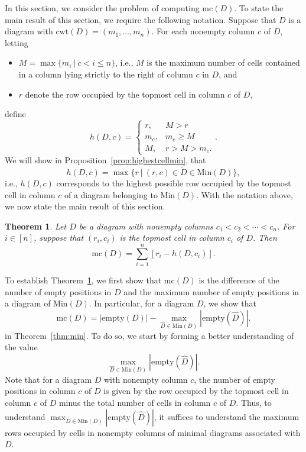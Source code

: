 \documentclass[letterpaper,10pt]{article}
\newtheorem{theorem}{Theorem}[section]
\begin{document}
In this section, we consider the problem of computing $\mathrm{mc}(D)$. To state the main result of this section, we require the following notation. Suppose that $D$ is a diagram with $\mathrm{cwt}(D)=(m_1,\hdots,m_n)$. For each nonempty column $c$ of $D$, letting 
\begin{itemize}
    \item $M=\max\{m_i~|~c<i\le n\}$, i.e., $M$ is the maximum number of cells contained in a column lying strictly to the right of column $c$ in $D$, and
    \item $r$ denote the row occupied by the topmost cell in column $c$ of $D$,
\end{itemize}
define $$h(D,c)=\begin{cases}
    r, & M>r \\
    m_c, & m_c\ge M \\
    M, & r>M> m_c.
\end{cases}.$$ We will show in Proposition~\ref{prop:highestcellmin}, that $$h(D,c)=\max\{r~|~(r,c)\in\tilde{D}\in\mathrm{Min}(D)\},$$ i.e., $h(D,c)$ corresponds to the highest possible row occupied by the topmost cell in column $c$ of a diagram belonging to $\textrm{Min}(D)$. With the notation above, we now state the main result of this section.

\begin{theorem}\label{thm:minmain}
    Let $D$ be a diagram with nonempty columns $c_1<c_2<\cdots<c_n$. For $i\in [n]$, suppose that $(r_i,c_i)$ is the topmost cell in column $c_i$ of $D$. Then $$\mathrm{mc}(D)=\sum_{i=1}^n[r_i-h(D,c_i)].$$
\end{theorem}

To establish Theorem~\ref{thm:minmain}, we first show that $\mathrm{mc}(D)$ is the difference of the number of empty positions in $D$ and the maximum number of empty positions in a diagram of $\mathrm{Min}(D)$. In particular, for a diagram $D$, we show that 
\begin{equation*}
    \mathrm{mc}(D)=|\mathrm{empty}(D)|-\max_{\widehat{D}\in\mathrm{Min}(D)}|\mathrm{empty}(\widehat{D})|.
\end{equation*}
in Theorem~\ref{thm:min}. To do so, we start by forming a better understanding of the value $$\max_{\widehat{D}\in\mathrm{Min}(D)}|\mathrm{empty}(\widehat{D})|.$$ Note that for a diagram $D$ with nonempty column $c$, the number of empty positions in column $c$ of $D$ is given by the row occupied by the topmost cell in column $c$ of $D$ minus the total number of cells in column $c$ of $D$. Thus, to understand $\max_{\widehat{D}\in\mathrm{Min}(D)}|\mathrm{empty}(\widehat{D})|$, it suffices to understand the maximum rows occupied by cells in nonempty columns of minimal diagrams associated with $D$.
\end{document}

